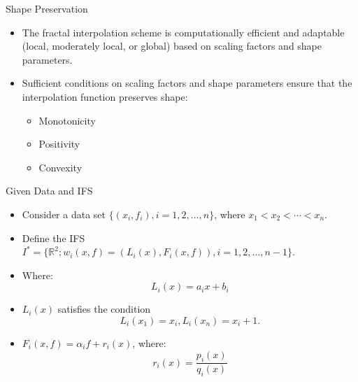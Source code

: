 \documentclass{beamer}
\begin{document}
\begin{frame}{Shape Preservation}
    \begin{itemize}
        \item The fractal interpolation scheme is computationally efficient and adaptable (local, moderately local, or global) based on scaling factors and shape parameters.
        \item Sufficient conditions on scaling factors and shape parameters ensure that the interpolation function preserves shape:
        \begin{itemize}
            \item Monotonicity
            \item Positivity
            \item Convexity
        \end{itemize}
        
    \end{itemize}
\end{frame}
\begin{frame}{Given Data and IFS}
    \begin{itemize}
        \item Consider a data set \(\{(x_i, f_i), i = 1, 2, \ldots, n\}\), where \( x_1 < x_2 < \cdots < x_n \).
        
    \end{itemize}

    \begin{itemize}
        \item Define the IFS \( I^* = \{ \mathbb{R}^2; w_i(x, f) = (L_i(x), F_i(x, f)), i = 1, 2, \ldots, n - 1\} \).
        \item Where:
        \[
        L_i(x) = a_i x + b_i
        \]
        \item \( L_i(x) \) satisfies the condition \\
        \[L_i(x_1) = x_i, L_i(x_n) = x_i+1.\] 
    \end{itemize}

    \begin{itemize}
        \item \( F_i(x, f) = \alpha_i f + r_i(x) \), where:
        \[
        r_i(x) = \frac{p_i(x)}{q_i(x)}
        \]
        \end{itemize}
        \end{frame}
\end{document}
